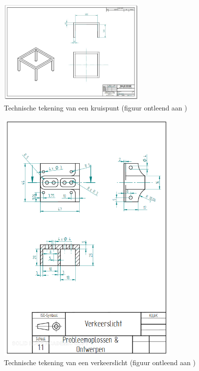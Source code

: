 \documentclass[a4paper,kulak]{kulakarticle} %
\begin{document}
\begin{figure}[h]
	\centering
	\includegraphics[width=0.65\textwidth]{tafelstel.png}
	\caption{Technische tekening van een kruispunt (figuur ontleend aan \cite{teamopdracht})}
	\label{techtekkruispunt}
\end{figure}

\begin{figure}
	\centering
	\includegraphics[width=0.8\textwidth]{verkeerslicht.png}
	\caption{Technische tekening van een verkeerslicht (figuur ontleend aan \cite{teamopdracht} )}
	\label{verkeerslicht}
\end{figure}
\end{document}
